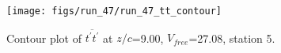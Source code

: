 \begin{figure}[H]
\centering
\texttt{[image: figs/run\_47/run\_47\_tt\_contour]}
\caption{Contour plot of $\overline{t^\prime t^\prime}$ at $z/c$=9.00, $V_{free}$=27.08, station 5.}
\end{figure}


